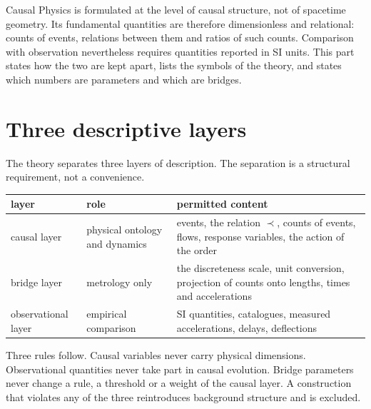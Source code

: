 
Causal Physics is formulated at the level of causal structure, not of spacetime geometry. Its
fundamental quantities are therefore dimensionless and relational: counts of events, relations
between them and ratios of such counts. Comparison with observation nevertheless requires
quantities reported in SI units. This part states how the two are kept apart, lists the symbols of
the theory, and states which numbers are parameters and which are bridges.

\section{Three descriptive layers}\label{sec:layers}

The theory separates three layers of description. The separation is a structural requirement, not
a convenience.

\begin{center}
\begin{tabularx}{\linewidth}{lXX}
\toprule
layer & role & permitted content\\
\midrule
causal layer & physical ontology and dynamics & events, the relation $\prec$, counts of events,
  flows, response variables, the action of the order\\
bridge layer & metrology only & the discreteness scale, unit conversion, projection of counts onto
  lengths, times and accelerations\\
observational layer & empirical comparison & SI quantities, catalogues, measured accelerations,
  delays, deflections\\
\bottomrule
\end{tabularx}
\end{center}

Three rules follow. Causal variables never carry physical dimensions. Observational quantities never
take part in causal evolution. Bridge parameters never change a rule, a threshold or a weight of the
causal layer. A construction that violates any of the three reintroduces background structure and
is excluded.

